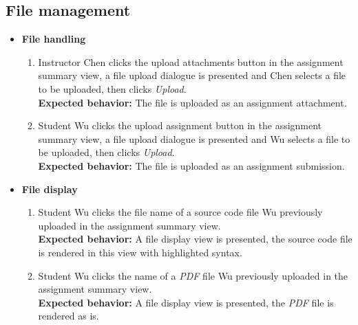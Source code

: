 \subsection{File management}
\begin{itemize}
    \item {\bf File handling} \begin{enumerate}
        \item Instructor Chen clicks the upload attachments button in the
            assignment summary view, a file upload dialogue is presented
            and Chen selects a file to be uploaded, then clicks \emph{Upload}. \\
        {\bf Expected behavior:} The file is uploaded as an assignment
            attachment.

        \item Student Wu clicks the upload assignment button in the
            assignment summary view, a file upload dialogue is presented
            and Wu selects a file to be uploaded, then clicks \emph{Upload}. \\
        {\bf Expected behavior:} The file is uploaded as an assignment
            submission.
    \end{enumerate}

    \item {\bf File display} \begin{enumerate}
        \item Student Wu clicks the file name of a source code file Wu
            previously uploaded in the assignment summary view. \\
        {\bf Expected behavior:} A file display view is presented, the source
            code file is rendered in this view with highlighted syntax.

        \item Student Wu clicks the name of a \emph{PDF} file Wu previously
            uploaded in the assignment summary view. \\
        {\bf Expected behavior:} A file display view is presented, the
            \emph{PDF} file is rendered as is.
    \end{enumerate}
\end{itemize}

